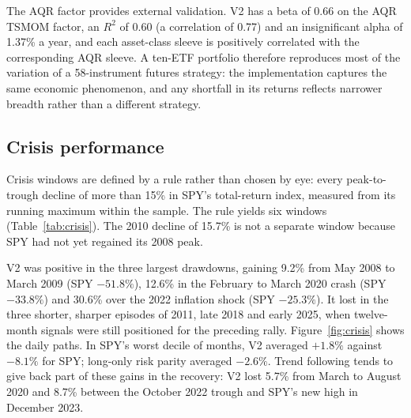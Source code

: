 \documentclass[11pt,a4paper]{article}
\newcommand{\tabfit}[1]{\resizebox{\textwidth}{!}{}}
\begin{document}
\begin{table}[!htbp]
\centering
\caption{Spanning regressions of monthly excess returns, $y_t = \alpha + \beta f_t + e_t$. Alpha annualised; Newey-West $t$-statistics. Benchmark regressions use 222 months; the AQR regressions use the 218 months to May 2026, aligned by calendar month. Correlations of V2's asset-class sleeves with the corresponding AQR asset-class factors: rates 0.83, currencies 0.69, commodities 0.65, equities 0.63.}
\label{tab:spanning}
\small

\end{table}

The AQR factor provides external validation. V2 has a beta of 0.66 on the AQR TSMOM factor, an $R^2$ of 0.60 (a correlation of 0.77) and an insignificant alpha of 1.37\% a year, and each asset-class sleeve is positively correlated with the corresponding AQR sleeve. A ten-ETF portfolio therefore reproduces most of the variation of a 58-instrument futures strategy: the implementation captures the same economic phenomenon, and any shortfall in its returns reflects narrower breadth rather than a different strategy.

\subsection{Crisis performance}

Crisis windows are defined by a rule rather than chosen by eye: every peak-to-trough decline of more than 15\% in SPY's total-return index, measured from its running maximum within the sample. The rule yields six windows (Table~\ref{tab:crisis}). The 2010 decline of 15.7\% is not a separate window because SPY had not yet regained its 2008 peak.

\begin{table}[!htbp]
\centering
\caption{Crisis windows: every SPY total-return drawdown deeper than 15\% from its running high, April 2008 to September 2026. SPY drawdown defines the window; the remaining columns are cumulative excess returns over T-bills from the day after the peak to the trough (\%). 60/40 + V2 and SPY + V2 are the 80/20 blends of Section~\ref{sec:blend}. Lower rows: mean monthly or quarterly excess return (\%) in SPY's worst decile of months and quarters.}
\label{tab:crisis}
\tabfit{tables/tab07_crisis}
\end{table}

V2 was positive in the three largest drawdowns, gaining 9.2\% from May 2008 to March 2009 (SPY $-51.8\%$), 12.6\% in the February to March 2020 crash (SPY $-33.8\%$) and 30.6\% over the 2022 inflation shock (SPY $-25.3\%$). It lost in the three shorter, sharper episodes of 2011, late 2018 and early 2025, when twelve-month signals were still positioned for the preceding rally. Figure~\ref{fig:crisis} shows the daily paths. In SPY's worst decile of months, V2 averaged $+1.8\%$ against $-8.1\%$ for SPY; long-only risk parity averaged $-2.6\%$. Trend following tends to give back part of these gains in the recovery: V2 lost 5.7\% from March to August 2020 and 8.7\% between the October 2022 trough and SPY's new high in December 2023.
\end{document}

